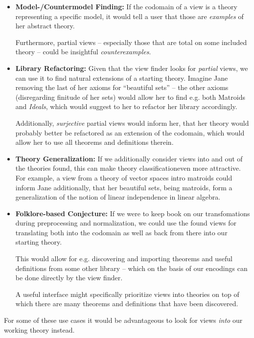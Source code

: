 \begin{itemize}
\item \textbf{Model-/Countermodel Finding:} If the codomain of a view is a theory representing a specific model, it would tell a user that those are \emph{examples} of her abstract theory.
		
  Furthermore, partial views -- especially those that are total on some included theory -- could be insightful \emph{counterexamples}.
	
\item \textbf{Library Refactoring:} Given that the view finder looks for \emph{partial} views, we can use it to find natural extensions of a starting theory. Imagine Jane removing the last of her axioms for ``beautiful sets'' -- the other axioms (disregarding finitude of her sets) would allow her to find e.g. both Matroids and \emph{Ideals}, which would suggest to her to refactor her library accordingly.
		
  Additionally, \emph{surjective} partial views would inform her, that her theory would probably better be refactored as an extension of the codomain, which would allow her to use all theorems and definitions therein.
		
\item \textbf{Theory Generalization:} If we additionally consider views into and out of the theories found, this can make theory classificationeven more attractive. For example, a view from a theory of vector spaces intro matroids could inform Jane additionally, that her beautiful sets, being matroids, form a generalization of the notion of linear independence in linear algebra.
		
\item \textbf{Folklore-based Conjecture:} If we were to keep book on our transfomations during preprocessing and normalization, we could use the found views for translating both into the codomain as well as back from there into our starting theory.
		
  This would allow for e.g. discovering and importing theorems and useful definitions from some other library -- which on the basis of our encodings can be done directly by the view finder.
		
  A useful interface might specifically prioritize views into theories on top of which there are many theorems and definitions that have been discovered.
\end{itemize}
For some of these use cases it would be advantageous to look for views \emph{into} our working theory instead. 
			
